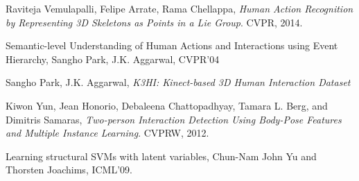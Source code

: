 \documentclass[10pt,twocolumn,letterpaper]{article}
\begin{document}
\begin{thebibliography}{9}

  Raviteja  Vemulapalli,
  Felipe Arrate,
  Rama Chellappa,
  \emph{Human Action Recognition by Representing 3D Skeletons as Points in a Lie Group}.
  CVPR,
  2014.

 Semantic-level Understanding of Human Actions and Interactions using Event Hierarchy, Sangho Park, J.K. Aggarwal, CVPR'04

	Sangho Park,
	J.K. Aggarwal,
	\emph{K3HI: Kinect-based 3D Human Interaction Dataset}

	Kiwon Yun, Jean Honorio, Debaleena Chattopadhyay, Tamara L. Berg, and Dimitris Samaras,
	\emph{Two-person Interaction Detection Using Body-Pose Features and Multiple Instance Learning}.
	CVPRW,
	2012.
	

 Learning structural SVMs with latent variables, Chun-Nam John Yu and Thorsten Joachims, ICML'09.



\end{thebibliography}
\end{document}
